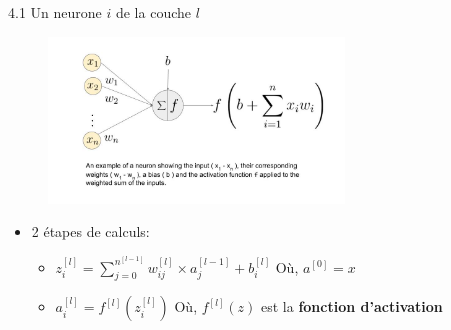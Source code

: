 \begin{frame}{4.1 Un neurone $i$ de la couche $l$}
  \begin{figure}
    \includegraphics[trim={2cm 6cm 2cm 1.8cm},clip,width=0.7\textwidth]{fig/neuronEx.jpg}
  \end{figure}
  \begin{itemize}
  \item 2 étapes de calculs: 
    \begin{itemize}
      \normalsize
    \item $z_{i}^{[l]} = \displaystyle\sum_{j=0}^{n^{[l-1]}} w_{ij}^{[l]} \times a_{j}^{[l-1]} + b_{i}^{[l]}$ \hspace{2cm} Où, $a^{[0]} = x$
    \item $a_{i}^{[l]} = f^{[l]}(z_{i}^{[l]})$ \hfill Où, $f^{[l]}(z)$ est la \textbf{fonction d'activation}
    \end{itemize}
  \end{itemize}
\end{frame}

